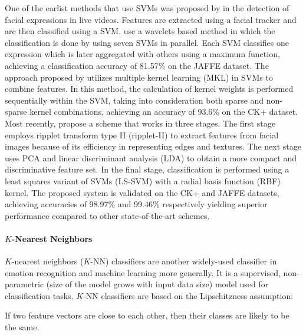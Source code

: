 \documentclass[12pt, a4paper]{article}
\begin{document}
One of the earlist methods that use SVMs was proposed by \cite{michel2003real} in the detection of facial expressions in live videos. Features are extracted using a facial tracker and are then classified using a SVM. \cite{kazmi2012wavelets} use a wavelets based method in which the classification is done by using seven SVMs in parallel. Each SVM classifies one expression which is later aggregated with others using a maximum function, achieving a classification accuracy of 81.57\% on the JAFFE dataset. The approach proposed by \cite{zhang2015facial} utilizes multiple kernel learning (MKL) in SVMs to combine features. In this method, the calculation of kernel weights is performed sequentially within the SVM, taking into consideration both sparse and non-sparse kernel combinations, achieving an accuracy of 93.6\% on the CK+ dataset. Most recently, \cite{kar2019face} propose a scheme that works in three stages. The first stage employs ripplet transform type II (ripplet-II) to extract features from facial images because of its efficiency in representing edges and textures. The next stage uses PCA and linear discriminant analysis (LDA) to obtain a more compact and discriminative feature set. In the final stage, classification is performed using a least squares variant of SVMs (LS-SVM) with a radial basis function (RBF) kernel. The proposed system is validated on the CK+ and JAFFE datasets, achieving accuracies of 98.97\% and 99.46\% respectively yielding superior performance compared to other state-of-the-art schemes.

\paragraph{$K$-Nearest Neighbors}

$K$-nearest neighbors ($K$-NN) classifiers are another widely-used classifier in emotion recognition and machine learning more generally. It is a supervised, non-parametric (size of the model grows with input data size) model used for classification tasks. $K$-NN classifiers are based on the Lipschitzness assumption:

\begin{tcolorbox}[colback=red!5!white,colframe=red!50!black,title=Lipschitzness Assumption]
If two feature vectors are close to each other, then their classes are likely to be the same.
\end{tcolorbox}
\end{document}
